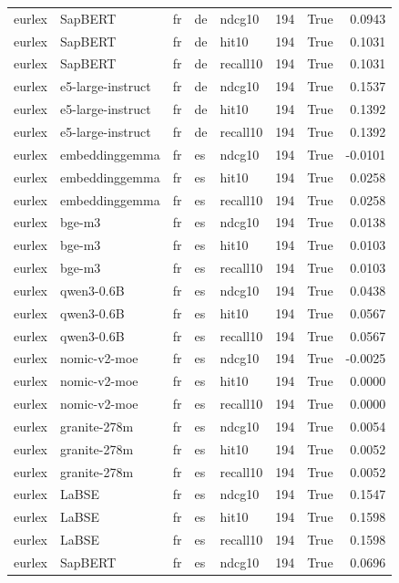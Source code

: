 \begin{tabular}{lllllrrr}
eurlex & SapBERT & fr & de & ndcg10 & 194 & True & 0.0943 \\
eurlex & SapBERT & fr & de & hit10 & 194 & True & 0.1031 \\
eurlex & SapBERT & fr & de & recall10 & 194 & True & 0.1031 \\
eurlex & e5-large-instruct & fr & de & ndcg10 & 194 & True & 0.1537 \\
eurlex & e5-large-instruct & fr & de & hit10 & 194 & True & 0.1392 \\
eurlex & e5-large-instruct & fr & de & recall10 & 194 & True & 0.1392 \\
eurlex & embeddinggemma & fr & es & ndcg10 & 194 & True & -0.0101 \\
eurlex & embeddinggemma & fr & es & hit10 & 194 & True & 0.0258 \\
eurlex & embeddinggemma & fr & es & recall10 & 194 & True & 0.0258 \\
eurlex & bge-m3 & fr & es & ndcg10 & 194 & True & 0.0138 \\
eurlex & bge-m3 & fr & es & hit10 & 194 & True & 0.0103 \\
eurlex & bge-m3 & fr & es & recall10 & 194 & True & 0.0103 \\
eurlex & qwen3-0.6B & fr & es & ndcg10 & 194 & True & 0.0438 \\
eurlex & qwen3-0.6B & fr & es & hit10 & 194 & True & 0.0567 \\
eurlex & qwen3-0.6B & fr & es & recall10 & 194 & True & 0.0567 \\
eurlex & nomic-v2-moe & fr & es & ndcg10 & 194 & True & -0.0025 \\
eurlex & nomic-v2-moe & fr & es & hit10 & 194 & True & 0.0000 \\
eurlex & nomic-v2-moe & fr & es & recall10 & 194 & True & 0.0000 \\
eurlex & granite-278m & fr & es & ndcg10 & 194 & True & 0.0054 \\
eurlex & granite-278m & fr & es & hit10 & 194 & True & 0.0052 \\
eurlex & granite-278m & fr & es & recall10 & 194 & True & 0.0052 \\
eurlex & LaBSE & fr & es & ndcg10 & 194 & True & 0.1547 \\
eurlex & LaBSE & fr & es & hit10 & 194 & True & 0.1598 \\
eurlex & LaBSE & fr & es & recall10 & 194 & True & 0.1598 \\
eurlex & SapBERT & fr & es & ndcg10 & 194 & True & 0.0696 \\

\end{tabular}

